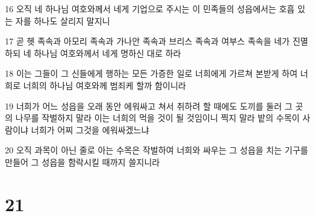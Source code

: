 \par 16 오직 네 하나님 여호와께서 네게 기업으로 주시는 이 민족들의 성읍에서는 호흡 있는 자를 하나도 살리지 말지니
\par 17 곧 헷 족속과 아모리 족속과 가나안 족속과 브리스 족속과 여부스 족속을 네가 진멸하되 네 하나님 여호와께서 네게 명하신 대로 하라
\par 18 이는 그들이 그 신들에게 행하는 모든 가증한 일로 너희에게 가르쳐 본받게 하여 너희로 너희의 하나님 여호와께 범죄케 할까 함이니라
\par 19 너희가 어느 성읍을 오래 동안 에워싸고 쳐서 취하려 할 때에도 도끼를 둘러 그 곳의 나무를 작벌하지 말라 이는 너희의 먹을 것이 될 것임이니 찍지 말라 밭의 수목이 사람이냐 너희가 어찌 그것을 에워싸겠느냐
\par 20 오직 과목이 아닌 줄로 아는 수목은 작벌하여 너희와 싸우는 그 성읍을 치는 기구를 만들어 그 성읍을 함락시킬 때까지 쓸지니라

\chapter{21}

